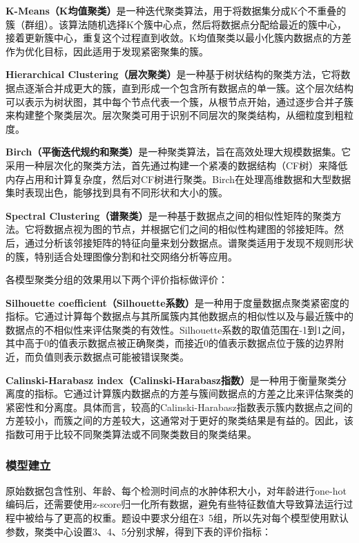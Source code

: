\documentclass[bwprint]{gmcmthesis}
\begin{document}
\textbf{K-Means（K均值聚类）}\cite{emon2020performance}是一种迭代聚类算法，用于将数据集分成K个不重叠的簇（群组）。该算法随机选择K个簇中心点，然后将数据点分配给最近的簇中心，接着更新簇中心，重复这个过程直到收敛。K均值聚类以最小化簇内数据点的方差作为优化目标，因此适用于发现紧密聚集的簇。

\textbf{Hierarchical Clustering（层次聚类）}\cite{zihni2020opening}是一种基于树状结构的聚类方法，它将数据点逐渐合并成更大的簇，直到形成一个包含所有数据点的单一簇。这个层次结构可以表示为树状图，其中每个节点代表一个簇，从根节点开始，通过逐步合并子簇来构建整个聚类层次。层次聚类可用于识别不同层次的聚类结构，从细粒度到粗粒度。

\textbf{Birch（平衡迭代规约和聚类）}\cite{guha2003clustering}是一种聚类算法，旨在高效处理大规模数据集。它采用一种层次化的聚类方法，首先通过构建一个紧凑的数据结构（CF树）来降低内存占用和计算复杂度，然后对CF树进行聚类。Birch在处理高维数据和大型数据集时表现出色，能够找到具有不同形状和大小的簇。

\textbf{Spectral Clustering（谱聚类）}\cite{razzak2020big}是一种基于数据点之间的相似性矩阵的聚类方法。它将数据点视为图的节点，并根据它们之间的相似性构建图的邻接矩阵。然后，通过分析该邻接矩阵的特征向量来划分数据点。谱聚类适用于发现不规则形状的簇，特别适合处理图像分割和社交网络分析等应用。

各模型聚类分组的效果用以下两个评价指标做评价：

\textbf{Silhouette coefficient（Silhouette系数）}是一种用于度量数据点聚类紧密度的指标。它通过计算每个数据点与其所属簇内其他数据点的相似性以及与最近簇中的数据点的不相似性来评估聚类的有效性。Silhouette系数的取值范围在-1到1之间，其中高于0的值表示数据点被正确聚类，而接近0的值表示数据点位于簇的边界附近，而负值则表示数据点可能被错误聚类。

\textbf{Calinski-Harabasz index（Calinski-Harabasz指数）}是一种用于衡量聚类分离度的指标。它通过计算簇内数据点的方差与簇间数据点的方差之比来评估聚类的紧密性和分离度。具体而言，较高的Calinski-Harabasz指数表示簇内数据点之间的方差较小，而簇之间的方差较大，这通常对于更好的聚类结果是有益的。因此，该指数可用于比较不同聚类算法或不同聚类数目的聚类结果。

\subsubsection{模型建立}

原始数据包含性别、年龄、每个检测时间点的水肿体积大小，对年龄进行one-hot编码后，还需要使用z-score归一化所有数据，避免有些特征数值大导致算法运行过程中被给与了更高的权重。题设中要求分组在3~5组，所以先对每个模型使用默认参数，聚类中心设置3、4、5分别求解，得到下表的评价指标：
\end{document}
